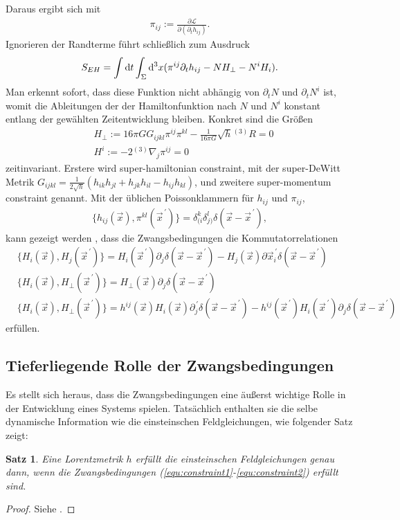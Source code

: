 \documentclass{scrartcl}
\newtheorem{theorem}{Satz}
\newcommand{\inHS}{{}^{(3)}\!}
\begin{document}
		Daraus ergibt sich mit
		\begin{align}
			\pi_{ij}:=\frac{\partial \mathcal{L}}{\partial(\partial_t h_{ij})}.
		\end{align}
		Ignorieren der Randterme führt schließlich zum Ausdruck
		\begin{align}
			S_{EH}=\int{\rm d}t\int_\Sigma {\rm d}^3x (\pi^{ij}\partial_t h_{ij}-NH_{\perp}-N^i H_i).
		\end{align}
		Man erkennt sofort, dass diese Funktion nicht abhängig von $\partial_t N$ und $\partial_t N^i$
		ist, womit die Ableitungen der der Hamiltonfunktion nach $N$ und $N^i$ konstant entlang der gewählten
		Zeitentwicklung bleiben. Konkret sind die Größen
		\begin{align}
			&H_{\perp}:=16\pi G G_{ijkl}\pi^{ij}\pi^{kl}-\frac{1}{16\pi G}\sqrt{h}\inHS R=0 \label{equ:constraint1}\\
			&H^i:=-2\inHS\nabla_j\pi^{ij}=0 \label{equ:constraint2}
		\end{align}
		zeitinvariant. Erstere wird super-hamiltonian constraint, mit der super-DeWitt Metrik $G_{ijkl}=\frac{1}{2\sqrt{h}}(h_{ik}h_{jl}+h_{jk}h_{il}-h_{ij}h_{kl})$,
		und zweitere super-momentum constraint genannt.
		Mit der üblichen Poissonklammern für $h_{ij}$ und $\pi_{ij}$,
		\begin{align}
			\{h_{ij}(\vec{x}),\pi^{kl}(\vec{x}^{\,\prime})\}=\delta^k_{(i}\delta^l_{j)}\delta(\vec{x}-\vec{x}^{\,\prime}),
		\end{align}
		kann gezeigt werden \cite{dirac2001lectures,cjm19510012}, dass die Zwangsbedingungen die Kommutatorrelationen \cite{qg06}
		\begin{align}
			&\{H_i(\vec{x}),H_j(\vec{x}^{\,\prime})\}=H_i(\vec{x}^{\,\prime})\partial_j\delta(\vec{x}-\vec{x}^{\,\prime})-H_j(\vec{x})\partial\vec{x}^{\,\prime}_i\delta(\vec{x}-\vec{x}^{\,\prime})\\
			&\{H_i(\vec{x}),H_\perp(\vec{x}^{\,\prime})\}=H_\perp(\vec{x})\partial_j\delta(\vec{x}-\vec{x}^{\,\prime})\\
			&\{H_i(\vec{x}),H_\perp(\vec{x}^{\,\prime})\}=h^{ij}(\vec{x})H_i(\vec{x})\partial^{\,\prime}_j\delta(\vec{x}-\vec{x}^{\,\prime})-h^{ij}(\vec{x}^{\,\prime})H_i(\vec{x}^{\,\prime})\partial_j\delta(\vec{x}-\vec{x}^{\,\prime})
		\end{align}
		erfüllen.
	\subsection{Tieferliegende Rolle der Zwangsbedingungen}
		Es stellt sich heraus, dass die Zwangsbedingungen eine äußerst wichtige Rolle in der
		Entwicklung eines Systems spielen. Tatsächlich enthalten sie die selbe dynamische
		Information wie die einsteinschen Feldgleichungen, wie folgender
		Satz zeigt:
		\begin{theorem}
			Eine Lorentzmetrik $h$ erf\"ullt die einsteinschen Feldgleichungen genau dann, wenn die
			Zwangsbedingungen (\ref{equ:constraint1}-\ref{equ:constraint2}) erf\"ullt sind.
			\label{thm:full}
		\end{theorem}
		\begin{proof}
			Siehe \cite{gr-qc/9210011}. %
		\end{proof}
\end{document}
